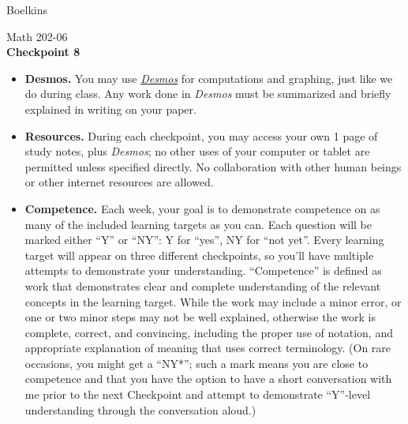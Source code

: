 \documentclass[11 pt]{article}
\begin{document}
 \hfill Boelkins \\
 
\begin{center}
Math 202-06 \\
{\bf Checkpoint 8}
\end{center}



\begin{itemize}
	
	\item {\bf Desmos.} You may use \href{https://www.desmos.com/calculator}{\emph{Desmos}} for computations and graphing, just like we do during class.  Any work done in \emph{Desmos} must be summarized and briefly explained in writing on your paper.  
	
	\item {\bf Resources.} During each checkpoint, you may access your own 1 page of study notes, plus \emph{Desmos}; no other uses of your computer or tablet are permitted unless specified directly.  No collaboration with other human beings or other internet resources are allowed.
	
	
	\item {\bf Competence.} Each week, your goal is to demonstrate competence on as many of the included learning targets as you can.  Each question will be marked either ``Y'' or ``NY'': Y for ``yes'', NY for ``not yet''.  Every learning target will appear on three different checkpoints, so you'll have multiple attempts to demonstrate your understanding.  ``Competence'' is defined as work that demonstrates clear and complete understanding of the relevant concepts in the learning target. While the work may include a minor error, or one or two minor steps may not be well explained, otherwise the work is complete, correct, and convincing, including the proper use of notation, and appropriate explanation of meaning that uses correct terminology.  (On rare occasions, you might get a ``NY*''; such a mark means you are close to competence and that you have the option to have a short conversation with me prior to the next Checkpoint and attempt to demonstrate ``Y''-level understanding through the conversation aloud.)	
\end{itemize}

\noindent \hrulefill \\
\end{document}
